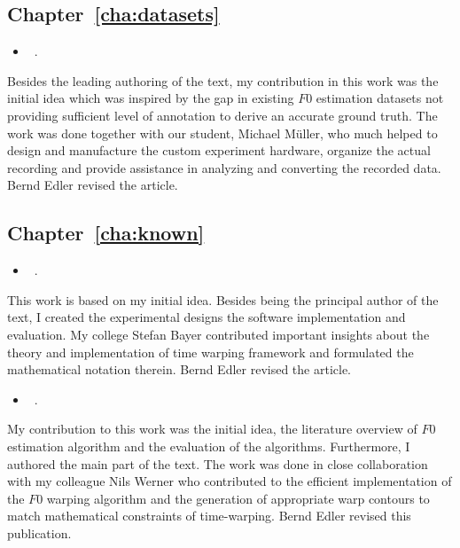 \subsection*{Chapter~\ref{cha:datasets}}

\begin{itemize}
  \item[\cite{stoeter15acm}] ~.
\end{itemize}
\noindent
Besides the leading authoring of the text, my contribution in this work was the initial idea which was inspired by the gap in existing $F0$ estimation datasets not providing sufficient level of annotation to derive an accurate ground truth.
The work was done together with our student, Michael Müller, who much helped to design and manufacture the custom experiment hardware, organize the actual recording and provide assistance in analyzing and converting the recorded data. Bernd Edler revised the article.

\subsection*{Chapter~\ref{cha:known}}

\begin{itemize}
  \item[\cite{stoeter14}] ~.
\end{itemize}
\noindent
This work is based on my initial idea. Besides being the principal author of the text, I created the experimental designs the software implementation and evaluation.
My college Stefan Bayer contributed important insights about the theory and implementation of time warping framework and formulated the mathematical notation therein. Bernd Edler revised the article.

\begin{itemize}
  \item[\cite{stoeter15icassp}] ~.
\end{itemize}
\noindent
My contribution to this work was the initial idea, the literature overview of $F0$ estimation algorithm and the evaluation of the algorithms. 
Furthermore, I authored the main part of the text.
The work was done in close collaboration with my colleague Nils Werner who contributed to the efficient implementation of the $F0$ warping algorithm and the generation of appropriate warp contours to match mathematical constraints of time-warping. Bernd Edler revised this publication.

